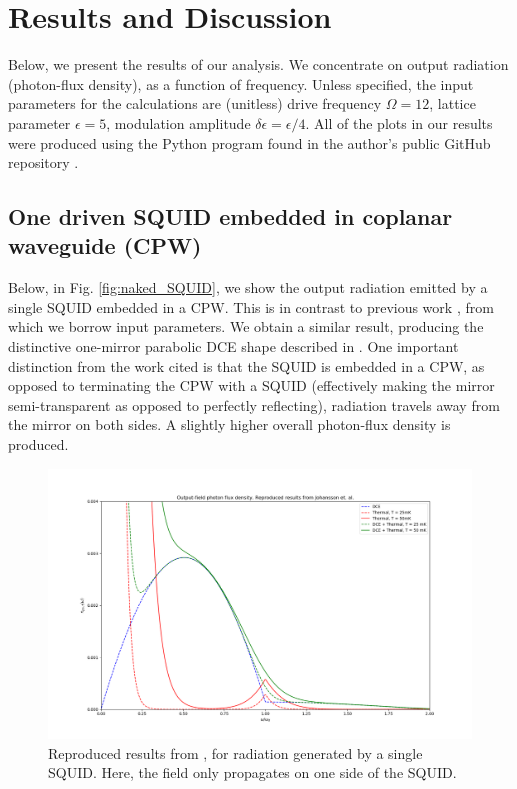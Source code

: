 \chapter{Results and Discussion}\label{ch:results}

Below, we present the results of our analysis. We concentrate on output radiation (photon-flux density), as a function of frequency. Unless specified, the input parameters for the calculations are (unitless) drive frequency $\Omega= 12$, lattice parameter $\epsilon = 5$, modulation amplitude $\delta \epsilon = \epsilon/4$. All of the plots in our results were produced using the Python program found in the author's public GitHub repository \cite{Github_Repository}.

\section{One driven SQUID embedded in coplanar waveguide (CPW) }\label{sec:results_both_sides}
%
Below, in Fig. \ref{fig:naked_SQUID}, we show the output radiation emitted by a single SQUID embedded in a CPW. This is in contrast to previous work \cite{Johansson2009}, from which we borrow input parameters. We obtain a similar result, producing the distinctive one-mirror parabolic DCE shape described in \cite{Lambrecht1996}. One important distinction from the work cited is that the SQUID is embedded in a CPW, as opposed to terminating the CPW with a SQUID (effectively making the mirror semi-transparent as opposed to perfectly reflecting), radiation travels away from the mirror on both sides. A slightly higher overall photon-flux density is produced. 
%
%
%
\begin{figure}
    \centering
    \includegraphics[width=\textwidth, keepaspectratio]{figures/intro/Johansson2010_reproduced.png}
    \caption{Reproduced results from \protect\cite{Johansson2010}, for radiation generated by a single SQUID. Here, the field only propagates on one side of the SQUID.}
    \label{fig:reproduced_Johansson_2}
\end{figure}
